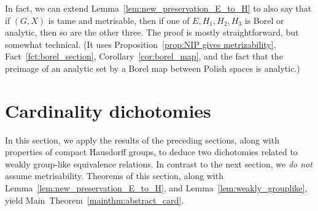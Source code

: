 	
	\begin{rem}
		\label{rem:tame_preservation}
		In fact, we can extend Lemma~\ref{lem:new_preservation_E_to_H} to also say that if $(G,X)$ is tame and metrisable, then if one of $E, H_1,H_2,H_3$ is Borel or analytic, then so are the other three. The proof is mostly straightforward, but somewhat technical. (It uses Proposition~\ref{prop:NIP gives metrizability}, Fact~\ref{fct:borel_section}, Corollary~\ref{cor:borel_map}, and the fact that the preimage of an analytic set by a Borel map between Polish spaces is analytic.)
		\xqed{\lozenge}
	\end{rem}
	
	\section{Cardinality dichotomies}
	\label{sec:dichot_cardinality}
	
	In this section, we apply the results of the preceding sections, along with properties of compact Hausdorff groups, to deduce two dichotomies related to weakly group-like equivalence relations. In contrast to the next section, we \emph{do not} assume metrisability. Theorems of this section, along with Lemma~\ref{lem:new_preservation_E_to_H}, and Lemma~\ref{lem:weakly_grouplike}, yield Main~Theorem~\ref{mainthm:abstract_card}.
	
